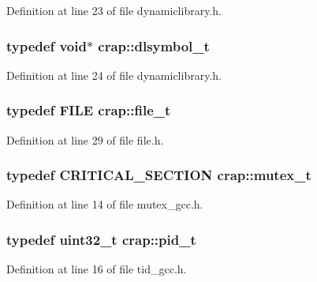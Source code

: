 Definition at line 23 of file dynamiclibrary.\+h.

\hypertarget{namespacecrap_a2eba1ed085b0da868a3cd8b2d6a4f7e7}{
\subsubsection[{dlsymbol\+\_\+t}]{\setlength{\rightskip}{0pt plus 5cm}typedef void$\ast$ {\bf crap\+::dlsymbol\+\_\+t}}}\label{namespacecrap_a2eba1ed085b0da868a3cd8b2d6a4f7e7}


Definition at line 24 of file dynamiclibrary.\+h.

\hypertarget{namespacecrap_afd3eedf00a9de7958b7dd70aafff79a4}{
\subsubsection[{file\+\_\+t}]{\setlength{\rightskip}{0pt plus 5cm}typedef F\+I\+L\+E {\bf crap\+::file\+\_\+t}}}\label{namespacecrap_afd3eedf00a9de7958b7dd70aafff79a4}


Definition at line 29 of file file.\+h.

\hypertarget{namespacecrap_a8800d1b9942594aef7c29a82865908b5}{
\subsubsection[{mutex\+\_\+t}]{\setlength{\rightskip}{0pt plus 5cm}typedef C\+R\+I\+T\+I\+C\+A\+L\+\_\+\+S\+E\+C\+T\+I\+O\+N {\bf crap\+::mutex\+\_\+t}}}\label{namespacecrap_a8800d1b9942594aef7c29a82865908b5}


Definition at line 14 of file mutex\+\_\+gcc.\+h.

\hypertarget{namespacecrap_a16bdcfd808340c5c364a5c78bbb1f39a}{
\subsubsection[{pid\+\_\+t}]{\setlength{\rightskip}{0pt plus 5cm}typedef uint32\+\_\+t {\bf crap\+::pid\+\_\+t}}}\label{namespacecrap_a16bdcfd808340c5c364a5c78bbb1f39a}


Definition at line 16 of file tid\+\_\+gcc.\+h.


